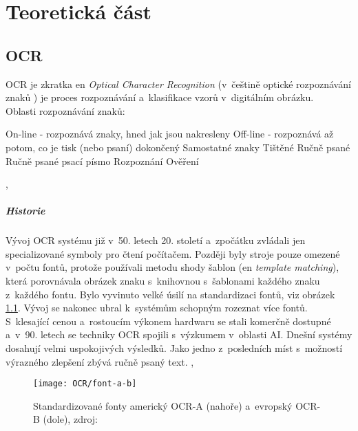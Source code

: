 \documentclass[12pt,oneside]{report}			%
\begin{document}
		
	
	\part{Teoretická část}
	\chapter{OCR}
	\label{sec:OCR}	
	OCR je zkratka \gls{en} \emph{Optical Character Recognition} (v~češtině optické rozpoznávání znaků \parencite{wiki:OCR}) je proces rozpoznávání a~klasifikace vzorů v~digitálním obrázku.\parencite[\gls{s} 9]{chaudhuri2017optical}\\
	Oblasti rozpoznávání znaků:
	\begin{outline}
	 	\1 On-line - rozpoznává znaky, hned jak jsou nakresleny
     	\1 Off-line - rozpoznává až potom, co je tisk (nebo psaní) dokončený
     		\2 Samostatné znaky
     			\3 Tištěné
     			\3	Ručně psané
     		\2 Ručně psané psací písmo
     			\3 Rozpoznání
     			 \3 Ověření
	\end{outline}
	\parencite[\gls{str} 12]{chaudhuri2017optical}, \parencite[\gls{str} 7]{eikvil-ocr}

	\subsubsection{Historie}
	\label{sec:OCR-history}
	 Vývoj \gls{OCR} systému již v~50. letech 20. století a~zpočátku zvládali jen specializované symboly pro čtení počítačem. Později byly stroje pouze omezené v~počtu fontů, protože používali metodu shody šablon (\gls{en}  \emph{template matching}), která porovnávala obrázek znaku s~knihovnou s~šablonami každého znaku z~každého fontu. Bylo vyvinuto velké úsilí na standardizaci fontů, \gls{viz} obrázek \ref{fig:ocr-font}. Vývoj se nakonec ubral k~systémům schopným rozeznat více fontů. S~klesající cenou a~rostoucím výkonem hardwaru se stali komerčně dostupné a~v~90. letech se techniky \gls{OCR} spojili s~výzkumem v~oblasti \gls{AI}. Dnešní systémy dosahují velmi uspokojivých výsledků. Jako jedno z~posledních míst s~možností výrazného zlepšení zbývá ručně psaný text. \parencite[\gls{s} 8-10]{eikvil-ocr}, \parencite[\gls{s} 15]{chaudhuri2017optical}
	\begin{figure}[h]
	\centering
	\texttt{[image: OCR/font-a-b]}
	\caption{Standardizované fonty americký OCR-A (nahoře) a~evropský OCR-B (dole), zdroj: \parencite[\gls{str} 9]{eikvil-ocr}}
	\label{fig:ocr-font}
	\end{figure}
		
\end{document}
